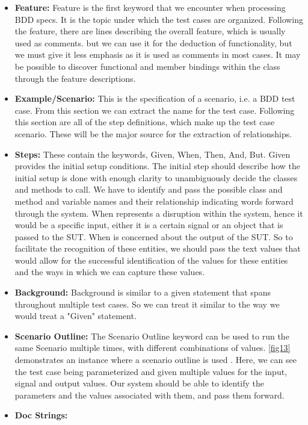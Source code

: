\documentclass[conference]{IEEEtran}
\begin{document}
\begin{itemize}
	\item \textbf{Feature:}
	Feature is the first keyword that we encounter when processing BDD specs. It is the topic under which the test cases are organized. Following the feature, there are lines describing the overall feature, which is usually used as comments. but we can use it for the deduction of functionality, but we must give it less emphasis as it is used as comments in most cases. It may be possible to discover functional and member bindings within the class through the feature descriptions.
	\item \textbf{Example/Scenario:}  
	This is the specification of a scenario, i.e. a BDD test case. From this section we can extract the name for the test case. Following this section are all of the step definitions, which make up the test case scenario. These will be the major source for the extraction of relationships.
	\item \textbf{Steps:}
	These contain the keywords, Given, When, Then, And, But. Given provides the initial setup conditions. The initial step should describe how the initial setup is done with enough clarity to unambiguously decide the classes and methods to call. We have to identify and pass the possible class and method and variable names and their relationship indicating words forward through the system. When represents a disruption within the system, hence it would be a specific input, either it is a certain signal or an object that is passed to the SUT. When is concerned about the output of the SUT. So to facilitate the recognition of these entities, we should pass the text values that would allow for the successful identification of the values for these entities and the ways in which we can capture these values.
	\item \textbf{Background:}
	Background is similar to a given statement that spans throughout multiple test cases. So we can treat it similar to the way we would treat a "Given" statement.
	\item \textbf{Scenario Outline:}
	The Scenario Outline keyword can be used to run the same Scenario multiple times, with different combinations of values. \ref{fig13} demonstrates an instance where a scenario outline is used \cite{a1}. Here, we can see the test case being parameterized and given multiple values for the input, signal and output values. Our system should be able to identify the parameters and the values associated with them, and pass them forward.
	\item \textbf{Doc Strings:}

\end{itemize}
\end{document}
